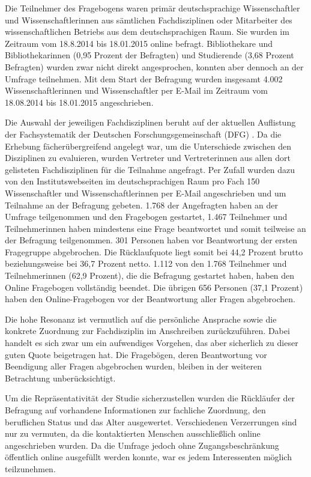 Die Teilnehmer des Fragebogens waren primär deutschsprachige Wissenschaftler und Wissenschaftlerinnen aus sämtlichen Fachdisziplinen oder Mitarbeiter des wissenschaftlichen Betriebs aus dem deutschsprachigen Raum. Sie wurden im Zeitraum vom 18.8.2014 bis 18.01.2015 online befragt. Bibliothekare und Bibliothekarinnen (0,95 Prozent der Befragten) und Studierende (3,68 Prozent Befragten) wurden zwar nicht direkt angesprochen, konnten aber dennoch an der Umfrage teilnehmen. Mit dem Start der Befragung wurden insgesamt 4.002 Wissenschaftlerinnen und Wissenschaftler per E-Mail im Zeitraum vom 18.08.2014 bis 18.01.2015 angeschrieben.

Die Auswahl der jeweiligen Fachdisziplinen beruht auf der aktuellen Auflistung der Fachsystematik der Deutschen Forschungsgemeinschaft (DFG) \cite{suchen_Webseite_DFG}. Da die Erhebung fächerübergreifend angelegt war, um die Unterschiede zwischen den Disziplinen zu evaluieren, wurden Vertreter und Vertreterinnen aus allen dort gelisteten Fachdisziplinen für die Teilnahme angefragt. Per Zufall wurden dazu von den Institutswebseiten im deutschsprachigen Raum pro Fach 150 Wissenschaftler und Wissenschaftlerinnen per E-Mail angeschrieben und um Teilnahme an der Befragung gebeten. 1.768 der Angefragten haben an der Umfrage teilgenommen und den Fragebogen gestartet, 1.467 Teilnehmer und Teilnehmerinnen haben mindestens eine Frage beantwortet und somit teilweise an der Befragung teilgenommen. 301 Personen haben vor Beantwortung der ersten Fragegruppe abgebrochen. Die Rücklaufquote liegt somit bei 44,2 Prozent brutto beziehungsweise bei 36,7 Prozent netto. 1.112 von den 1.768 Teilnehmer und Teilnehmerinnen (62,9 Prozent), die die Befragung gestartet haben, haben den Online Fragebogen vollständig beendet. Die übrigen 656 Personen (37,1 Prozent) haben den Online-Fragebogen vor der Beantwortung aller Fragen abgebrochen.

Die hohe Resonanz ist vermutlich auf die persönliche Ansprache sowie die konkrete Zuordnung zur Fachdisziplin im Anschreiben zurückzuführen. Dabei handelt es sich zwar um ein aufwendiges Vorgehen, das aber sicherlich zu dieser guten Quote beigetragen hat. Die Fragebögen, deren Beantwortung vor Beendigung aller Fragen abgebrochen wurden, bleiben in der weiteren Betrachtung unberücksichtigt.

Um die Repräsentativität der Studie sicherzustellen wurden die Rückläufer der Befragung auf vorhandene Informationen zur fachliche Zuordnung, den beruflichen Status und das Alter ausgewertet. Verschiedenen Verzerrungen sind nur zu vermuten, da die kontaktierten Menschen ausschließlich online angeschrieben wurden. Da die Umfrage jedoch ohne Zugangsbeschränkung öffentlich online ausgefüllt werden konnte, war es jedem Interessenten möglich teilzunehmen.

